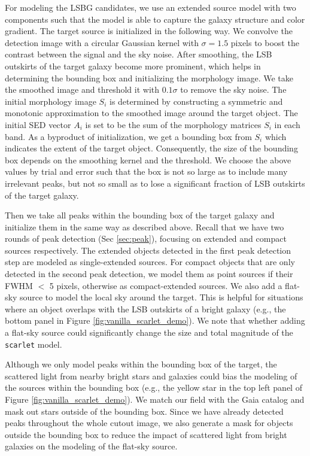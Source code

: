 \documentclass[twocolumn,astrosymb,twocolappendix]{aastex631}
\newcommand{\code}[1]{\texttt{#1}}
\begin{document}
\begin{CJK*}{UTF8}{gbsn}
For modeling the LSBG candidates, we use an extended source model with two components such that the model is able to capture the galaxy structure and color gradient. The target source is initialized in the following way. We convolve the detection image with a circular Gaussian kernel with $\sigma=1.5$ pixels to boost the contrast between the signal and the sky noise. After smoothing, the LSB outskirts of the target galaxy become more prominent, which helps in determining the bounding box and initializing the morphology image. We take the smoothed image and threshold it with $0.1\sigma$ to remove the sky noise. The initial morphology image $S_i$ is determined by constructing a symmetric and monotonic approximation to the smoothed image around the target object. The initial SED vector $A_i$ is set to be the sum of the morphology matrices $S_i$ in each band. As a byproduct of initialization, we get a bounding box from $S_i$ which indicates the extent of the target object. Consequently, the size of the bounding box depends on the smoothing kernel and the threshold. We choose the above values by trial and error such that the box is not so large as to include many irrelevant peaks, but not so small as to lose a significant fraction of LSB outskirts of the target galaxy. 

Then we take all peaks within the bounding box of the target galaxy and initialize them in the same way as described above. Recall that we have two rounds of peak detection (Sec \ref{sec:peak}), focusing on extended and compact sources respectively. The extended objects detected in the first peak detection step are modeled as single-extended sources. For compact objects that are only detected in the second peak detection, we model them as point sources if their FWHM $<$ 5 pixels, otherwise as compact-extended sources. We also add a flat-sky source to model the local sky around the target. This is helpful for situations where an object overlaps with the LSB outskirts of a bright galaxy (e.g., the bottom panel in Figure \ref{fig:vanilla_scarlet_demo}). We note that whether adding a flat-sky source could significantly change the size and total magnitude of the \code{scarlet} model.

Although we only model peaks within the bounding box of the target, the scattered light from nearby bright stars and galaxies could bias the modeling of the sources within the bounding box (e.g., the yellow star in the top left panel of Figure \ref{fig:vanilla_scarlet_demo}). We match our field with the Gaia catalog \citep{GAIA2016,GAIA2018} and mask out stars outside of the bounding box. Since we have already detected peaks throughout the whole cutout image, we also generate a mask for objects outside the bounding box to reduce the impact of scattered light from bright galaxies on the modeling of the flat-sky source. 


\end{CJK*}
\end{document}
